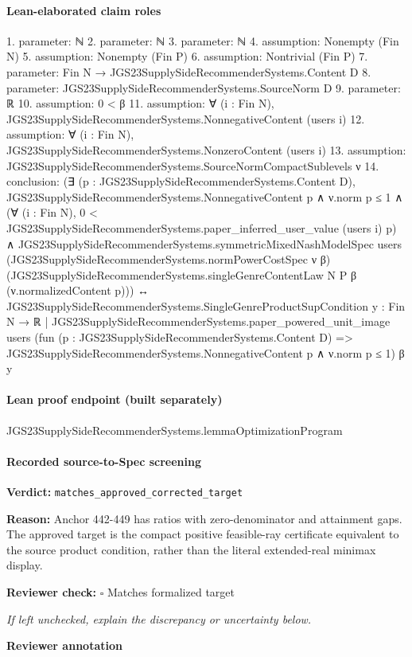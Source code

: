 \documentclass[10pt]{article}
\newcommand{\reviewerbox}{%
  \par\noindent\fbox{\parbox{0.96\linewidth}{\rule{0pt}{0.38in}}}\par
}
\newcommand{\reviewmatch}[1]{%
  \par\noindent\textbf{Reviewer check:} $\square$\; #1\par
  \noindent\emph{If left unchecked, explain the discrepancy or uncertainty below.}\par
}
\begin{document}
\paragraph{Lean-elaborated claim roles}\begin{ReviewVerbatim}
1. parameter: ℕ
2. parameter: ℕ
3. parameter: ℕ
4. assumption: Nonempty (Fin N)
5. assumption: Nonempty (Fin P)
6. assumption: Nontrivial (Fin P)
7. parameter: Fin N → JGS23SupplySideRecommenderSystems.Content D
8. parameter: JGS23SupplySideRecommenderSystems.SourceNorm D
9. parameter: ℝ
10. assumption: 0 < β
11. assumption: ∀ (i : Fin N), JGS23SupplySideRecommenderSystems.NonnegativeContent (users i)
12. assumption: ∀ (i : Fin N), JGS23SupplySideRecommenderSystems.NonzeroContent (users i)
13. assumption: JGS23SupplySideRecommenderSystems.SourceNormCompactSublevels ν
14. conclusion: (∃ (p : JGS23SupplySideRecommenderSystems.Content D),
    JGS23SupplySideRecommenderSystems.NonnegativeContent p ∧
      ν.norm p ≤ 1 ∧
        (∀ (i : Fin N), 0 < JGS23SupplySideRecommenderSystems.paper_inferred_user_value (users i) p) ∧
          JGS23SupplySideRecommenderSystems.symmetricMixedNashModelSpec users
            (JGS23SupplySideRecommenderSystems.normPowerCostSpec ν β)
            (JGS23SupplySideRecommenderSystems.singleGenreContentLaw N P β (ν.normalizedContent p))) ↔
  JGS23SupplySideRecommenderSystems.SingleGenreProductSupCondition
    {y : Fin N → ℝ |
      JGS23SupplySideRecommenderSystems.paper_powered_unit_image users
        (fun (p : JGS23SupplySideRecommenderSystems.Content D) =>
          JGS23SupplySideRecommenderSystems.NonnegativeContent p ∧ ν.norm p ≤ 1)
        β y}
\end{ReviewVerbatim}

\paragraph{Lean proof endpoint (built separately)}\begin{ReviewVerbatim}
JGS23SupplySideRecommenderSystems.lemmaOptimizationProgram
\end{ReviewVerbatim}

\paragraph{Recorded source-to-Spec screening}
\textbf{Verdict:} \texttt{matches\_approved\_corrected\_target}
\\
{\raggedright
\textbf{Reason:} Anchor 442-\allowbreak{}449 has ratios with zero-\allowbreak{}denominator and attainment gaps.\allowbreak{}  The approved target is the compact positive feasible-\allowbreak{}ray certificate equivalent to the source product condition, rather than the literal extended-\allowbreak{}real minimax display.\allowbreak{}
\par}
\reviewmatch{Matches formalized target}
\noindent\textbf{Reviewer annotation}\par
\reviewerbox
\clearpage
\hypertarget{source-claim-b9fe1dcef2a40678}{}
\end{document}
